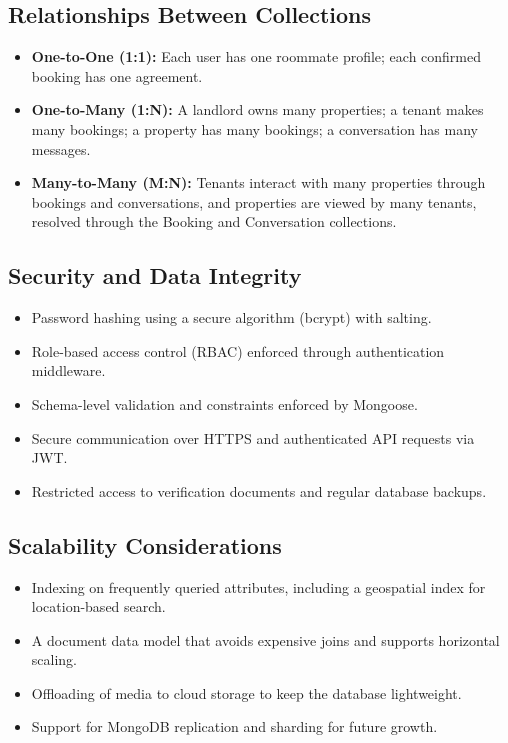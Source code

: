 \subsection{Relationships Between Collections}

\begin{itemize}
    \item \textbf{One-to-One (1:1):} Each user has one roommate profile; each confirmed booking has one agreement.
    \item \textbf{One-to-Many (1:N):} A landlord owns many properties; a tenant makes many bookings; a property has many bookings; a conversation has many messages.
    \item \textbf{Many-to-Many (M:N):} Tenants interact with many properties through bookings and conversations, and properties are viewed by many tenants, resolved through the Booking and Conversation collections.
\end{itemize}

\subsection{Security and Data Integrity}

\begin{itemize}
    \item Password hashing using a secure algorithm (bcrypt) with salting.
    \item Role-based access control (RBAC) enforced through authentication middleware.
    \item Schema-level validation and constraints enforced by Mongoose.
    \item Secure communication over HTTPS and authenticated API requests via JWT.
    \item Restricted access to verification documents and regular database backups.
\end{itemize}

\subsection{Scalability Considerations}

\begin{itemize}
    \item Indexing on frequently queried attributes, including a geospatial index for location-based search.
    \item A document data model that avoids expensive joins and supports horizontal scaling.
    \item Offloading of media to cloud storage to keep the database lightweight.
    \item Support for MongoDB replication and sharding for future growth.
\end{itemize}

